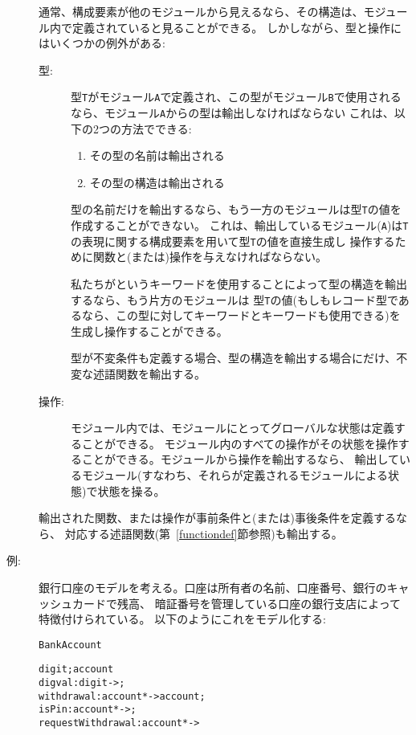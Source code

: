 \documentclass[\pformat,12pt]{jarticle}
\begin{document}
\begin{description}
  通常、構成要素が他のモジュールから見えるなら、その構造は、モジュール内で定義されていると見ることができる。
 しかしながら、型と操作にはいくつかの例外がある:

  \begin{description}
  \item[型:] 型{\tt T}がモジュール{\tt A}で定義され、この型がモジュール{\tt B}で使用されるなら、モジュール{\tt A}からの型は輸出しなければならない
    これは、以下の2つの方法でできる:
    \begin{enumerate}
    \item その型の名前は輸出される
    \item その型の構造は輸出される
    \end{enumerate}
    型の名前だけを輸出するなら、もう一方のモジュールは型{\tt T}の値を作成することができない。
	これは、輸出しているモジュール({\tt A})は{\tt T}の表現に関する構成要素を用いて型{\tt T}の値を直接生成し
	操作するために関数と(または)操作を与えなければならない。

	私たちがというキーワードを使用することによって型の構造を輸出するなら、もう片方のモジュールは
	型{\tt T}の値(もしもレコード型であるなら、この型に対してキーワードとキーワードも使用できる)を生成し操作することができる。

    型が不変条件も定義する場合、型の構造を輸出する場合にだけ、不変な述語関数を輸出する。

  \item[操作:] モジュール内では、モジュールにとってグローバルな状態は定義することができる。 
  モジュール内のすべての操作がその状態を操作することができる。モジュールから操作を輸出するなら、
  輸出しているモジュール(すなわち、それらが定義されるモジュールによる状態)で状態を操る。
  \end{description}

 輸出された関数、または操作が事前条件と(または)事後条件を定義するなら、
 対応する述語関数(第~\ref{functiondef}節参照)も輸出する。


\item[例:] 銀行口座のモデルを考える。口座は所有者の名前、口座番号、銀行のキャッシュカードで残高、
暗証番号を管理している口座の銀行支店によって特徴付けられている。
以下のようにこれをモデル化する:
\begin{alltt}
 BankAccount

    digit; account
           digval: digit -> ;
                  withdrawal: account *  -> account;
                  isPin: account *  -> ;
                  requestWithdrawal: account *  -> 


\end{alltt}
\end{description}
\end{document}

